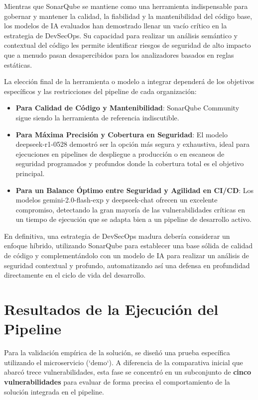 Mientras que SonarQube se mantiene como una herramienta indispensable para gobernar y mantener la calidad, la fiabilidad y la mantenibilidad del código base, los modelos de IA evaluados han demostrado llenar un vacío crítico en la estrategia de DevSecOps. Su capacidad para realizar un análisis semántico y contextual del código les permite identificar riesgos de seguridad de alto impacto que a menudo pasan desapercibidos para los analizadores basados en reglas estáticas.

La elección final de la herramienta o modelo a integrar dependerá de los objetivos específicos y las restricciones del pipeline de cada organización:
\begin{itemize}
    \item \textbf{Para Calidad de Código y Mantenibilidad}: SonarQube Community sigue siendo la herramienta de referencia indiscutible.
    \item \textbf{Para Máxima Precisión y Cobertura en Seguridad}: El modelo deepseek-r1-0528 demostró ser la opción más segura y exhaustiva, ideal para ejecuciones en pipelines de despliegue a producción o en escaneos de seguridad programados y profundos donde la cobertura total es el objetivo principal.
    \item \textbf{Para un Balance Óptimo entre Seguridad y Agilidad en CI/CD}: Los modelos gemini-2.0-flash-exp y deepseek-chat ofrecen un excelente compromiso, detectando la gran mayoría de las vulnerabilidades críticas en un tiempo de ejecución que se adapta bien a un pipeline de desarrollo activo.
\end{itemize}

En definitiva, una estrategia de DevSecOps madura debería considerar un enfoque híbrido, utilizando SonarQube para establecer una base sólida de calidad de código y complementándolo con un modelo de IA para realizar un análisis de seguridad contextual y profundo, automatizando así una defensa en profundidad directamente en el ciclo de vida del desarrollo.

\section{Resultados de la Ejecución del Pipeline}
\label{subsec:analisis_resultados_pipeline}

Para la validación empírica de la solución, se diseñó una prueba específica utilizando el microservicio (`demo`). A diferencia de la comparativa inicial que abarcó trece vulnerabilidades, esta fase se concentró en un subconjunto de \textbf{cinco vulnerabilidades} para evaluar de forma precisa el comportamiento de la solución integrada en el pipeline.

